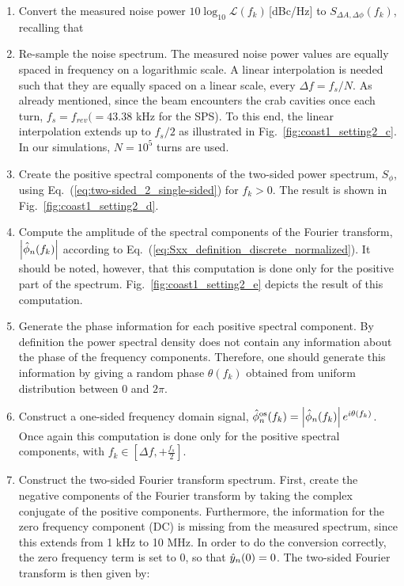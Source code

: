 \begin{enumerate}
    \item Convert the measured noise power $10\log_{10}\mathcal{L}(f_k)$\,[dBc/Hz] to $S_{\Delta A, \Delta \phi}(f_k)$, recalling that 
    
    \item Re-sample the noise spectrum. The measured noise power values are equally spaced in frequency on a logarithmic scale. A linear interpolation is needed such that they are equally spaced on a linear scale, every $\Delta f = f_s/N$. As already mentioned, since the beam encounters the crab cavities once each turn, $f_s=f_{rev}(=43.38$ kHz for the SPS). To this end, the linear interpolation extends up to $f_s/2$ as illustrated in Fig.~\ref{fig:coast1_setting2_c}. In our simulations, $N=10^5$ turns are used.
    \item Create the positive spectral components of the two-sided power spectrum, $S_\phi$, using Eq.~(\ref{eq:two-sided_2_single-sided}) for $f_k>0$. The result is shown in Fig.~\ref{fig:coast1_setting2_d}.
    \item Compute the amplitude of the spectral components of the Fourier transform, $\left | \hat{\phi}_n(f_k) \right | $ according to Eq.~(\ref{eq:Sxx_definition_discrete_normalized}). It should be noted, however, that this computation is done only for the positive part of the spectrum. Fig.~\ref{fig:coast1_setting2_e} depicts the result of this computation. 
    \item Generate the phase information for each positive spectral component. By definition the power spectral density does not contain any information about the phase of the frequency components. Therefore, one should generate this information by giving a random phase $\theta(f_k)$ obtained from uniform distribution between 0 and $2\pi$.
    \item Construct a one-sided frequency domain signal, $\hat{\phi}_n^\mathrm{os}(f_k) =\left| \hat{\phi}_n(f_k) \right| e^{{i} \theta(f_k)}$.  Once again this computation is done only for the positive spectral components, with $f_k \in \left[\Delta f,+\frac{f_s}{2} \right ]$.
    \item Construct the two-sided Fourier transform spectrum. First, create the negative components of the Fourier transform by taking the complex conjugate of the positive components. Furthermore, the information for the zero frequency component (DC) is missing from the measured spectrum, since this extends from  1 kHz to 10 MHz. In order to do the conversion correctly, the zero frequency term is set to 0, so that $\hat{y}_n(0)=0$. The two-sided Fourier transform is then given by:
    


\end{enumerate}
